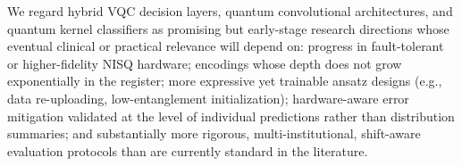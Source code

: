 \documentclass[11pt,a4paper]{article}
\begin{document}
We regard hybrid VQC decision layers, quantum convolutional architectures, and
quantum kernel classifiers as promising but early-stage research directions
whose eventual clinical or practical relevance will depend on: progress in
fault-tolerant or higher-fidelity NISQ hardware; encodings whose depth does not
grow exponentially in the register; more expressive yet trainable ansatz
designs (e.g., data re-uploading, low-entanglement initialization);
hardware-aware error mitigation validated at the level of individual
predictions rather than distribution summaries; and substantially more
rigorous, multi-institutional, shift-aware evaluation protocols than are
currently standard in the literature.

\end{document}

